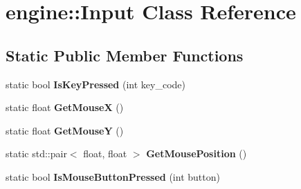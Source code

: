 \hypertarget{classengine_1_1Input}{}\section{engine\+:\+:Input Class Reference}
\label{classengine_1_1Input}
\subsection*{Static Public Member Functions}
\begin{DoxyCompactItemize}
\item 
\mbox{\label{classengine_1_1Input_a79ec265ab6800cb0b1f627bfdb3cfc28}} 
static bool {\bfseries Is\+Key\+Pressed} (int key\+\_\+code)
\item 
\mbox{\label{classengine_1_1Input_a13095584400184088868e6ff9c9f0a5d}} 
static float {\bfseries Get\+MouseX} ()
\item 
\mbox{\label{classengine_1_1Input_aa6fa67ccfdb48ac903c927157f0809c2}} 
static float {\bfseries Get\+MouseY} ()
\item 
\mbox{\label{classengine_1_1Input_a4a15d91ac4241fc6dc3584c051e1b50a}} 
static std\+::pair$<$ float, float $>$ {\bfseries Get\+Mouse\+Position} ()
\item 
\mbox{\label{classengine_1_1Input_acaa32590a2b39e0eb822c01d5b7815dc}} 
static bool {\bfseries Is\+Mouse\+Button\+Pressed} (int button)
\end{DoxyCompactItemize}
